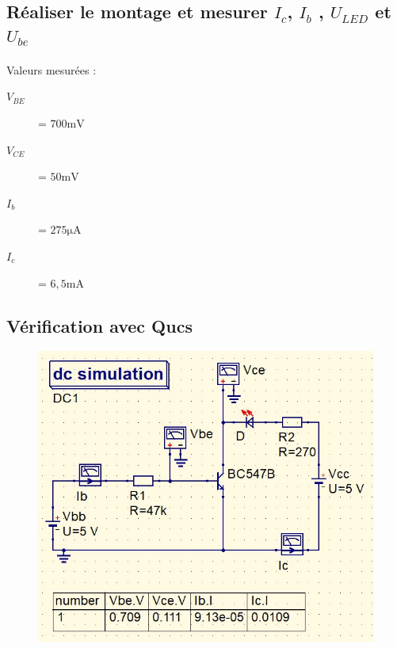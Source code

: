\documentclass{article}
\begin{document}
\subsection{Réaliser le montage et mesurer $I_c$, $I_b$ , $U_{LED}$ et $U_{be}$}
\paragraph{}Valeurs mesurées :
\begin{description}
    \item[$V_{BE}$] = $700\si{\milli\volt}$
    \item[$V_{CE}$] = $50\si{\milli\volt}$
    \item[$I_b$] = $275\si{\micro\ampere}$
    \item[$I_c$] = $6,5\si{\milli\ampere}$
\end{description}

\subsection{Vérification avec Qucs}
\begin{figure}[H]
    \centering
    \includegraphics[width=.6\linewidth]{images/labo2-qucs.jpg}
\end{figure}


\newpage
\end{document}

